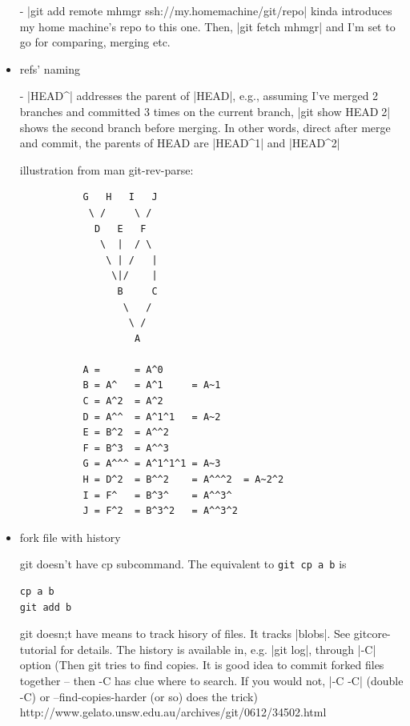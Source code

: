 \begin{itemize}
- |git add remote mhmgr ssh://my.homemachine/git/repo| kinda introduces
  my home machine's repo to this one. Then, |git fetch mhmgr| and I'm
  set to go for comparing, merging etc.

\item{refs' naming}

- |HEAD^| addresses the parent of |HEAD|, e.g., assuming I've
  merged 2 branches and committed 3 times on the current branch, 
  |git show HEAD^^^2| shows the second branch before merging. In
  other words, direct after merge and commit, the parents of HEAD are
  |HEAD^1|  and |HEAD^2|  
   
   illustration from man git-rev-parse:
   
   \begin{code} \begin{verbatim}
           G   H   I   J
            \ /     \ /
             D   E   F
              \  |  / \
               \ | /   |
                \|/    |
                 B     C
                  \   /
                   \ /
                    A

           A =      = A^0
           B = A^   = A^1     = A~1
           C = A^2  = A^2
           D = A^^  = A^1^1   = A~2
           E = B^2  = A^^2
           F = B^3  = A^^3
           G = A^^^ = A^1^1^1 = A~3
           H = D^2  = B^^2    = A^^^2  = A~2^2
           I = F^   = B^3^    = A^^3^
           J = F^2  = B^3^2   = A^^3^2

\end{verbatim} \end{code}

\item{fork file with history}

git doesn't have cp subcommand. The equivalent to \verb+git cp a b+ is 
\begin{code}\begin{verbatim}
cp a b
git add b
\end{verbatim} \end{code}

git doesn;t have means to track hisory of files. It tracks |blobs|.
See gitcore-tutorial for details. The history is available in, e.g.
%
|git log|, through |-C| option (Then git tries to find copies.
It is good idea to commit forked files together -- then -C has clue
where to search. If you would not, |-C -C| (double -C) or
--find-copies-harder (or so) does the trick)
http://www.gelato.unsw.edu.au/archives/git/0612/34502.html

\end{itemize}




